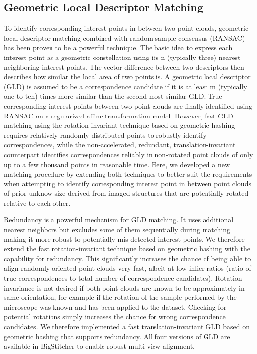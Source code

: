 \subsection*{Geometric Local Descriptor Matching}

To identify corresponding interest points in between two point clouds, geometric local descriptor matching combined with random sample consensus (RANSAC\cite{ransac}) has been proven to be a powerful technique\cite{beads,descriptor}. The basic idea to express each interest point as a geometric constellation using its n (typically three) nearest neighboring interest points. The vector difference between two descriptors then describes how similar the local area of two points is. A geometric local descriptor (GLD) is assumed to be a correspondence candidate if it is at least m (typically one to ten) times more similar than the second most similar GLD\cite{lowe2004distinctive}. True corresponding interest points between two point clouds are finally identified using RANSAC on a regularized affine transformation model. However, fast GLD matching using the rotation-invariant technique based on geometric hashing\cite{beads} requires relatively randomly distributed points to robustly identify correspondences, while the non-accelerated, redundant, translation-invariant counterpart\cite{descriptor} identifies correspondences reliably in non-rotated point clouds of only up to a few thousand points in reasonable time. Here, we developed a new matching procedure by extending both techniques to better suit the requirements when attempting to identify corresponding interest point in between point clouds of prior unknow size derived from imaged structures that are potentially rotated relative to each other.

Redundancy is a powerful mechanism for GLD matching. It uses additional nearest neighbors but excludes some of them sequentially during matching making it more robust to potentially mis-detected interest points\cite{descriptor}. We therefore extend the fast rotation-invariant technique based on geometric hashing\cite{beads} with the capability for redundancy. This significantly increases the chance of being able to align randomly oriented point clouds very fast, albeit at low inlier ratios (ratio of true correspondences to total number of correspondence candidates). Rotation invariance is not desired if both point clouds are known to be approximately in same orientation, for example if the rotation of the sample performed by the microscope was known and has been applied to the dataset. Checking for potential rotations simply increases the chance for wrong correspondence candidates. We therefore implemented a fast translation-invariant GLD based on geometric hashing that supports redundancy. All four versions of GLD are available in BigStitcher to enable robust multi-view alignment.

